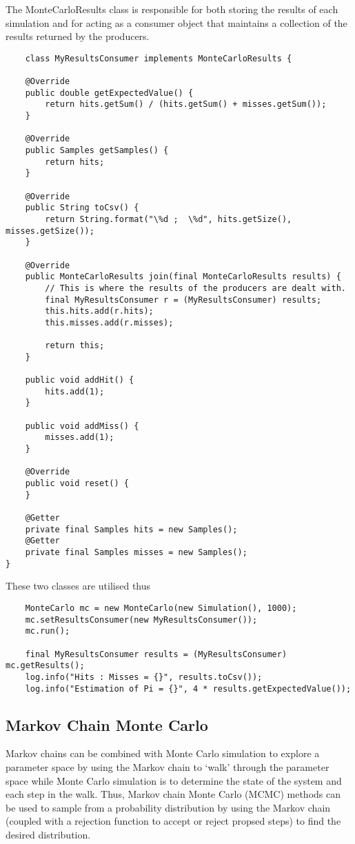 The MonteCarloResults class is responsible for both storing the results of each simulation and for acting as a consumer
object that maintains a collection of the results returned by the producers.

\begin{lstlisting}
    class MyResultsConsumer implements MonteCarloResults {

    @Override
    public double getExpectedValue() {
        return hits.getSum() / (hits.getSum() + misses.getSum());
    }

    @Override
    public Samples getSamples() {
        return hits;
    }

    @Override
    public String toCsv() {
        return String.format("\%d ;  \%d", hits.getSize(), misses.getSize());
    }

    @Override
    public MonteCarloResults join(final MonteCarloResults results) {
        // This is where the results of the producers are dealt with.
        final MyResultsConsumer r = (MyResultsConsumer) results;
        this.hits.add(r.hits);
        this.misses.add(r.misses);

        return this;
    }

    public void addHit() {
        hits.add(1);
    }

    public void addMiss() {
        misses.add(1);
    }
    
    @Override
    public void reset() {
    }
    
    @Getter
    private final Samples hits = new Samples();
    @Getter
    private final Samples misses = new Samples();
}
\end{lstlisting}

These two classes are utilised thus
\begin{lstlisting}
    MonteCarlo mc = new MonteCarlo(new Simulation(), 1000);
    mc.setResultsConsumer(new MyResultsConsumer());
    mc.run();

    final MyResultsConsumer results = (MyResultsConsumer) mc.getResults();
    log.info("Hits : Misses = {}", results.toCsv());
    log.info("Estimation of Pi = {}", 4 * results.getExpectedValue());
\end{lstlisting}

\subsection{Markov Chain Monte Carlo}
Markov chains can be combined with Monte Carlo simulation to explore a parameter space by using the Markov chain to `walk' through the parameter space while Monte Carlo simulation is to determine the state of the system and each step in the walk. Thus, Markov chain Monte Carlo (MCMC) methods can be used to sample from a probability distribution by using the Markov chain (coupled with a rejection function to accept or reject propsed steps) to find the desired distribution. 

